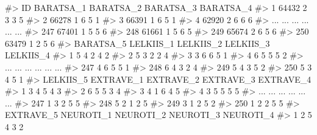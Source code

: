 \documentclass[
  letterpaper,
]{krantz}
\makeatletter
\newenvironment{Shaded}{\begin{snugshade}}{\end{snugshade}}
\newcommand{\CommentTok}[1]{\textcolor[rgb]{0.37,0.37,0.37}{#1}}
\newenvironment{kframe}{%
\medskip{}
\setlength{\fboxsep}{.8em}
 \def\at@end@of@kframe{}%
 \ifinner\ifhmode%
  \def\at@end@of@kframe{\end{minipage}}%
  \begin{minipage}{\columnwidth}%
 \fi\fi%
 \def\FrameCommand##1{\hskip\@totalleftmargin \hskip-\fboxsep
 \colorbox{shadecolor}{##1}\hskip-\fboxsep
     \hskip-\linewidth \hskip-\@totalleftmargin \hskip\columnwidth}%
 \MakeFramed {\advance\hsize-\width
   \@totalleftmargin\z@ \linewidth\hsize
   \@setminipage}}%
 {\par\unskip\endMakeFramed%
 \at@end@of@kframe}
\renewenvironment{Shaded}{\begin{kframe}}{\end{kframe}}
\makeatother
\begin{document}
\begin{Shaded}
\begin{Highlighting}[]
\CommentTok{\#\textgreater{}        ID BARATSA\_1 BARATSA\_2 BARATSA\_3 BARATSA\_4}
\CommentTok{\#\textgreater{} 1   64432         2         3         3         5}
\CommentTok{\#\textgreater{} 2   66278         1         6         5         1}
\CommentTok{\#\textgreater{} 3   66391         1         6         5         1}
\CommentTok{\#\textgreater{} 4   62920         2         6         6         6}
\CommentTok{\#\textgreater{} ...   ...       ...       ...       ...       ...}
\CommentTok{\#\textgreater{} 247 67401         1         5         5         6}
\CommentTok{\#\textgreater{} 248 61661         1         5         6         5}
\CommentTok{\#\textgreater{} 249 65674         2         6         5         6}
\CommentTok{\#\textgreater{} 250 63479         1         2         5         6}
\CommentTok{\#\textgreater{}     BARATSA\_5 LELKIIS\_1 LELKIIS\_2 LELKIIS\_3 LELKIIS\_4}
\CommentTok{\#\textgreater{} 1           5         4         2         4         2}
\CommentTok{\#\textgreater{} 2           5         3         2         2         4}
\CommentTok{\#\textgreater{} 3           3         6         6         5         1}
\CommentTok{\#\textgreater{} 4           6         5         5         5         2}
\CommentTok{\#\textgreater{} ...       ...       ...       ...       ...       ...}
\CommentTok{\#\textgreater{} 247         4         6         5         5         1}
\CommentTok{\#\textgreater{} 248         6         4         3         2         4}
\CommentTok{\#\textgreater{} 249         5         4         3         5         2}
\CommentTok{\#\textgreater{} 250         5         3         4         5         1}
\CommentTok{\#\textgreater{}     LELKIIS\_5 EXTRAVE\_1 EXTRAVE\_2 EXTRAVE\_3 EXTRAVE\_4}
\CommentTok{\#\textgreater{} 1           3         4         5         4         3}
\CommentTok{\#\textgreater{} 2           6         5         5         3         4}
\CommentTok{\#\textgreater{} 3           4         1         6         4         5}
\CommentTok{\#\textgreater{} 4           3         5         5         5         5}
\CommentTok{\#\textgreater{} ...       ...       ...       ...       ...       ...}
\CommentTok{\#\textgreater{} 247         1         3         2         5         5}
\CommentTok{\#\textgreater{} 248         5         2         1         2         5}
\CommentTok{\#\textgreater{} 249         3         1         2         5         2}
\CommentTok{\#\textgreater{} 250         1         2         2         5         5}
\CommentTok{\#\textgreater{}     EXTRAVE\_5 NEUROTI\_1 NEUROTI\_2 NEUROTI\_3 NEUROTI\_4}
\CommentTok{\#\textgreater{} 1           2         5         4         3         2}

\end{Highlighting}
\end{Shaded}
\end{document}

